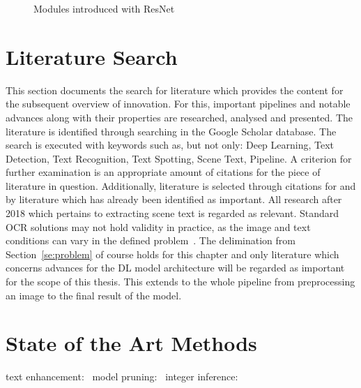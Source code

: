 \begin{figure}[ht]
    \centering
    \caption{Modules introduced with ResNet\label{fig:resnet}}
\end{figure}

\section{Literature Search}\label{se:litSearch}
This section documents the search for literature which provides the content for the subsequent
overview of innovation.
For this, important pipelines and notable advances along with their properties are researched,
analysed and presented.
The literature is identified through searching in the Google Scholar database.
The search is executed with keywords such as, but not only: Deep Learning, Text Detection,
Text Recognition, Text Spotting, Scene Text, Pipeline.
A criterion for further examination is an appropriate amount of citations for the piece of literature
in question.
Additionally, literature is selected through citations for and by literature which has already been
identified as important.
All research after 2018 which pertains to extracting scene text is regarded as relevant.
Standard \ac{OCR} solutions may not hold validity in practice, as the image and text conditions can
vary in the defined problem~\citep{chen_text_2021}.
The delimination from Section~\ref{se:problem} of course holds for this chapter and only literature
which concerns advances for the \ac{DL} model architecture will be regarded as important for the
scope of this thesis.
This extends to the whole pipeline from preprocessing an image to the final result of the model.



\section{State of the Art Methods}

text enhancement:~\cite{chen_text_2021}
model pruning:~\cite{niu_26ms_2019}
integer inference:~\cite{ignatov_ai_2019}
